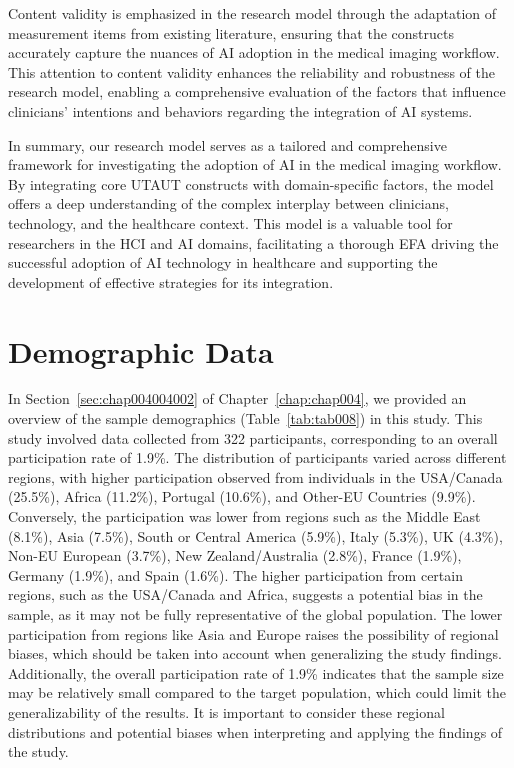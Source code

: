 Content validity is emphasized in the research model through the adaptation of measurement items from existing literature, ensuring that the constructs accurately capture the nuances of \ac{AI} adoption in the medical imaging workflow.
This attention to content validity enhances the reliability and robustness of the research model, enabling a comprehensive evaluation of the factors that influence clinicians' intentions and behaviors regarding the integration of \ac{AI} systems.

In summary, our research model serves as a tailored and comprehensive framework for investigating the adoption of \ac{AI} in the medical imaging workflow.
By integrating core \ac{UTAUT} constructs with domain-specific factors, the model offers a deep understanding of the complex interplay between clinicians, technology, and the healthcare context.
This model is a valuable tool for researchers in the \ac{HCI} and \ac{AI} domains, facilitating a thorough \ac{EFA} driving the successful adoption of \ac{AI} technology in healthcare and supporting the development of effective strategies for its integration.

\section{Demographic Data}
\label{chap:app002003}

In Section~\ref{sec:chap004004002} of Chapter~\ref{chap:chap004}, we provided an overview of the sample demographics (Table~\ref{tab:tab008}) in this study.
This study involved data collected from 322 participants, corresponding to an overall participation rate of 1.9\%.
The distribution of participants varied across different regions, with higher participation observed from individuals in the USA/Canada (25.5\%), Africa (11.2\%), Portugal (10.6\%), and Other-EU Countries (9.9\%).
Conversely, the participation was lower from regions such as the Middle East (8.1\%), Asia (7.5\%), South or Central America (5.9\%), Italy (5.3\%), UK (4.3\%), Non-EU European (3.7\%), New Zealand/Australia (2.8\%), France (1.9\%), Germany (1.9\%), and Spain (1.6\%).
The higher participation from certain regions, such as the USA/Canada and Africa, suggests a potential bias in the sample, as it may not be fully representative of the global population.
The lower participation from regions like Asia and Europe raises the possibility of regional biases, which should be taken into account when generalizing the study findings.
Additionally, the overall participation rate of 1.9\% indicates that the sample size may be relatively small compared to the target population, which could limit the generalizability of the results.
It is important to consider these regional distributions and potential biases when interpreting and applying the findings of the study.

